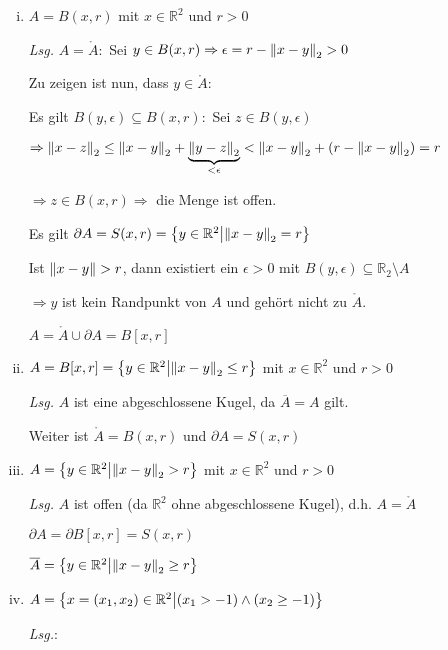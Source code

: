 \documentclass{scrreprt}
\begin{document}
\begin{enumerate}[(i)]
\item $A = B(x, r)$ mit $x \in \mathbb{R}^2$ und $r > 0$

  \textit{Lsg.} $A = \mathring A \colon $ Sei $y \in B(x, r) \Rightarrow \epsilon = r - \norm{x - y}_2 > 0$

  Zu zeigen ist nun, dass $y \in \mathring A$:

  Es gilt $B(y, \epsilon) \subseteq B(x, r) \colon$ Sei $z \in B(y, \epsilon)$

  $\Rightarrow \norm{x - z}_2 \leq \norm{x - y}_2 + \underset{< \epsilon}{\underbrace{\norm{y - z}_2}}
  < \norm{x - y}_2 + (r - \norm{x - y}_2) = r$

  $\Rightarrow z \in B(x, r) \Rightarrow$ die Menge ist offen.

  Es gilt $\partial A = S(x, r) = \qty{ y \in \mathbb{R}^2 \middle| \norm{x - y}_2 = r }$

  Ist $\norm{x - y} > r$, dann existiert ein $\epsilon > 0$ mit
  $B(y, \epsilon) \subseteq \mathbb{R}_2 \setminus A$

  $\Rightarrow y$ ist kein Randpunkt von $A$ und gehört nicht zu $\mathring A$.

  $A = \mathring A \cup \partial A = B[x, r]$
\item $A = B[x, r] = \qty{y \in \mathbb{R}^2 \middle| \norm{x - y}_2 \leq r}$ mit $x \in \mathbb{R}^2$ und $r > 0$

  \textit{Lsg.} $A$ ist eine abgeschlossene Kugel, da $\overline A = A$ gilt.

  Weiter ist $\mathring A = B(x, r)$ und $\partial A = S(x, r)$

\item $A = \qty{y \in \mathbb{R}^2 \middle| \norm{x - y}_2 > r}$ mit $x \in \mathbb{R}^2$ und $r > 0$

  \textit{Lsg.} $A$ ist offen (da $\mathbb{R}^2$ ohne abgeschlossene Kugel), d.h. $A = \mathring A$

  $\partial A = \partial B[x, r] = S(x, r)$

  $\overline A = \qty{y \in \mathbb{R}^2 \middle| \norm{x - y}_2 \geq r}$

\item $A = \qty{x = \qty(x_1, x_2) \in \mathbb{R}^2 \middle| \qty(x_1 > -1) \land \qty(x_2 \geq -1)}$

  \textit{Lsg.}:


\end{enumerate}
\end{document}
